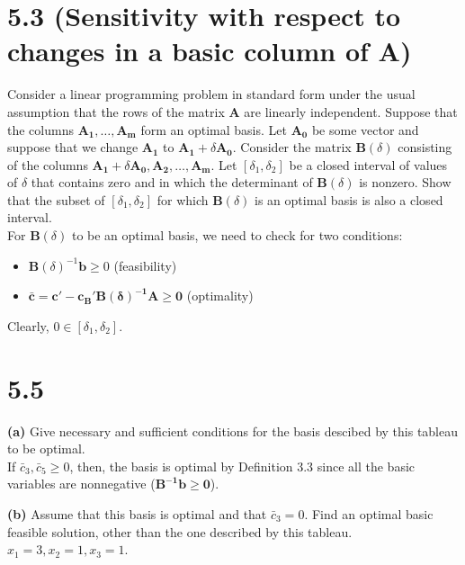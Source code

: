 \documentclass{article}
\begin{document}
\section*{5.3 (Sensitivity with respect to changes in a basic column of A)}
Consider a linear programming problem in standard form under the usual assumption that the rows of the matrix $\mathbf{A}$ are linearly independent.  Suppose that the columns $\mathbf{A_1, \ldots, A_m}$ form an optimal basis.  Let $\mathbf{A_0}$ be some vector and suppose that we change $\mathbf{A_1}$ to $\mathbf{A_1} + \delta \mathbf{A_0}$.  Consider the matrix $\mathbf{B}(\delta)$ consisting of the columns $\mathbf{A_1} + \delta \mathbf{A_0, A_2, \ldots, A_m}$.  Let $[\delta_1, \delta_2]$ be a closed interval of values of $\delta$ that contains zero and in which the determinant of $\mathbf{B}(\delta)$ is nonzero.  Show that the subset of $[\delta_1, \delta_2]$ for which $\mathbf{B}(\delta)$ is an optimal basis is also a closed interval.  \\


\noindent
For $\mathbf{B}(\delta)$ to be an optimal basis, we need to check for two conditions:
\begin{itemize}
	\item $\mathbf{B}(\delta)^{-1} \mathbf{b} \geq 0$ (feasibility) 
	\item $\mathbf{ \bar{c} = c' - c_B' B(\delta)^{-1}A \geq 0 }$ (optimality)
\end{itemize}

\noindent
Clearly, $0 \in [\delta_1, \delta_2].$


\section*{5.5}

\textbf{(a)} Give necessary and sufficient conditions for the basis descibed by this tableau to be optimal. \\

\noindent If $\bar{c}_3, \bar{c}_5 \geq 0$, then, the basis is optimal by Definition 3.3 since all the basic variables are nonnegative ($\mathbf{B^{-1}b \geq 0}$).

\textbf{(b)} Assume that this basis is optimal and that $\bar{c}_3 = 0$.  Find an optimal basic feasible solution, other than the one described by this tableau. \\

\noindent $ x_1 = 3, x_2 = 1, x_3 = 1 $. \\
\end{document}
